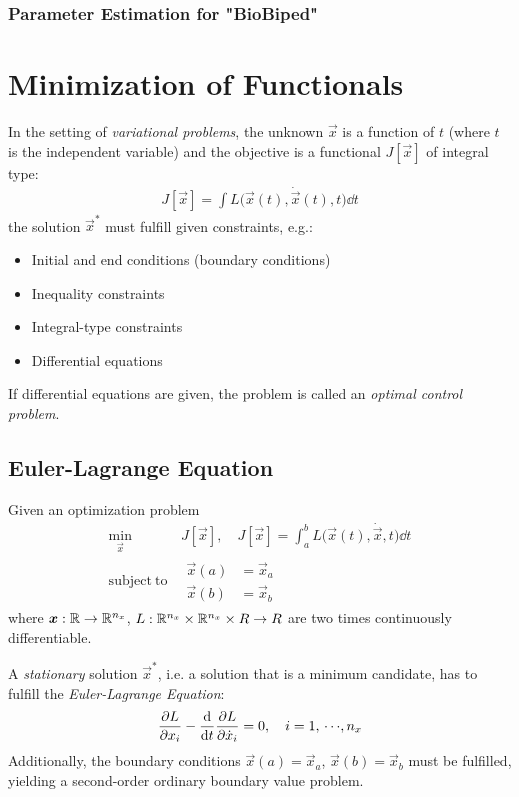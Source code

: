 		\subsection{Parameter Estimation for "BioBiped"} %

\chapter{Minimization of Functionals}
	In the setting of \emph{variational problems}, the unknown \(\vec{x}\) is a function of \(t\) (where \(t\) is the independent variable) and the objective is a functional \( J[\vec{x}] \) of integral type:
	\begin{align*}
		J[\vec{x}] = \int\! L\big( \vec{x}(t), \dot{\vec{x}}(t), t \big) \dd{t}
	\end{align*}
	the solution \( \vec{x}^\ast \) must fulfill given constraints, e.g.:
	\begin{itemize}
		\item Initial and end conditions (boundary conditions)
		\item Inequality constraints
		\item Integral-type constraints
		\item Differential equations
	\end{itemize}
	If differential equations are given, the problem is called an \emph{optimal control problem}.

	\section{Euler-Lagrange Equation} %
		Given an optimization problem
		\begin{align*}
			\min_{\vec{x}}      & \, J[\vec{x}],\quad J[\vec{x}] = \int_a^b\! L\big(\vec{x}(t), \dot{\vec{x}}, t\big) \dd{t} \\
			\mathrm{subject~to} & \,
			\begin{alignedat}{2}
				\vec{x}(a) &= \vec{x}_a \\
				\vec{x}(b) &= \vec{x}_b
			\end{alignedat}
		\end{align*}
		where \( \bm{x} : \mathbb{R} \to \mathbb{R}^{n_x} \), \( L : \mathbb{R}^{n_x} \times \mathbb{R}^{n_x} \times R \to R \) are two times continuously differentiable.

		A \emph{stationary} solution \( \vec{x}^\ast \), i.e. a solution that is a minimum candidate, has to fulfill the \emph{Euler-Lagrange Equation}:
		\begin{align*}
			\pdv{L}{x_i} - \dv{t} \pdv{L}{\dot{x}_i} = 0,\quad i = 1,\,\cdots\!,n_x
		\end{align*}
		Additionally, the boundary conditions \( \vec{x}(a) = \vec{x}_a \), \( \vec{x}(b) = \vec{x}_b \) must be fulfilled, yielding a second-order ordinary boundary value problem.

